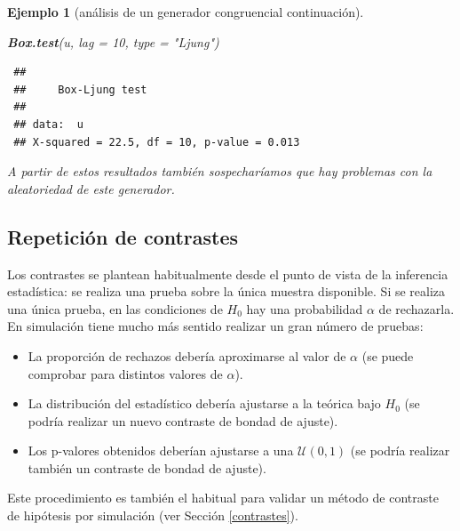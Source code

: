 \documentclass[
  spanish,
  10pt,
]{book}
\newenvironment{Shaded}{\begin{snugshade}}{\end{snugshade}}
\newcommand{\AttributeTok}[1]{\textcolor[rgb]{0.13,0.29,0.53}{#1}}
\newcommand{\DecValTok}[1]{\textcolor[rgb]{0.00,0.00,0.81}{#1}}
\newcommand{\FunctionTok}[1]{\textcolor[rgb]{0.13,0.29,0.53}{\textbf{#1}}}
\newcommand{\NormalTok}[1]{#1}
\newcommand{\StringTok}[1]{\textcolor[rgb]{0.31,0.60,0.02}{#1}}
\theoremstyle{break}
\newtheorem{example}{Ejemplo}[chapter]
\theoremstyle{nonumberplain}
\begin{document}
\begin{example}[análisis de un generador congruencial continuación]
\begin{Shaded}
\begin{Highlighting}[]
\FunctionTok{Box.test}\NormalTok{(u, }\AttributeTok{lag =} \DecValTok{10}\NormalTok{, }\AttributeTok{type =} \StringTok{"Ljung"}\NormalTok{)}
\end{Highlighting}
\end{Shaded}

\begin{verbatim}
 ## 
 ##     Box-Ljung test
 ## 
 ## data:  u
 ## X-squared = 22.5, df = 10, p-value = 0.013
\end{verbatim}

A partir de estos resultados también sospecharíamos que hay problemas con la aleatoriedad de este generador.
\end{example}

\subsection{Repetición de contrastes}\label{repeticiuxf3n-de-contrastes}

Los contrastes se plantean habitualmente desde el punto de vista de la inferencia estadística: se realiza una prueba sobre la única muestra disponible.
Si se realiza una única prueba, en las condiciones de \(H_0\) hay una probabilidad \(\alpha\) de rechazarla.
En simulación tiene mucho más sentido realizar un gran número de pruebas:

\begin{itemize}
\item
  La proporción de rechazos debería aproximarse al valor de
  \(\alpha\) (se puede comprobar para distintos valores de \(\alpha\)).
\item
  La distribución del estadístico debería ajustarse a la teórica
  bajo \(H_0\) (se podría realizar un nuevo contraste de bondad
  de ajuste).
\item
  Los p-valores obtenidos deberían ajustarse a una
  \(\mathcal{U}\left(0,1\right)\) (se podría realizar también un
  contraste de bondad de ajuste).
\end{itemize}

Este procedimiento es también el habitual para validar un método de
contraste de hipótesis por simulación (ver Sección \ref{contrastes}).
\end{document}
